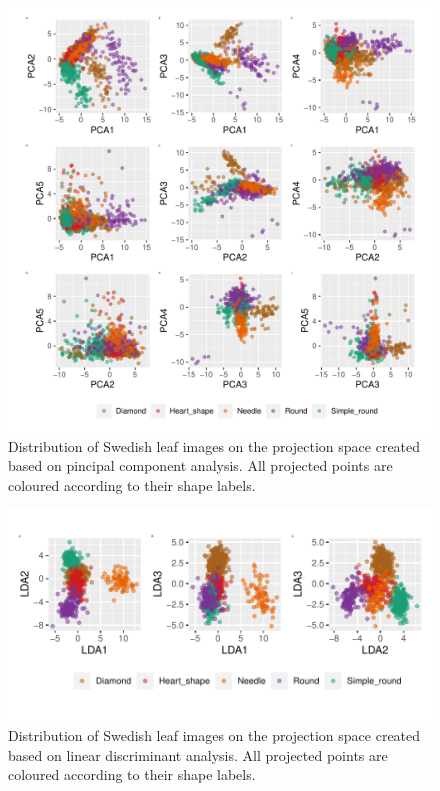 \documentclass{article}
\begin{document}
\begin{figure}
\centering
\includegraphics{img/pcaswedish-1.pdf}
\caption{\label{pcaswedish}Distribution of Swedish leaf images on the
projection space created based on pincipal component analysis. All
projected points are coloured according to their shape labels.}
\end{figure}

\begin{figure}
\centering
\includegraphics{img/ldaswedish-1.pdf}
\caption{\label{ldaswedish}Distribution of Swedish leaf images on the
projection space created based on linear discriminant analysis. All
projected points are coloured according to their shape labels.}
\end{figure}
\end{document}
